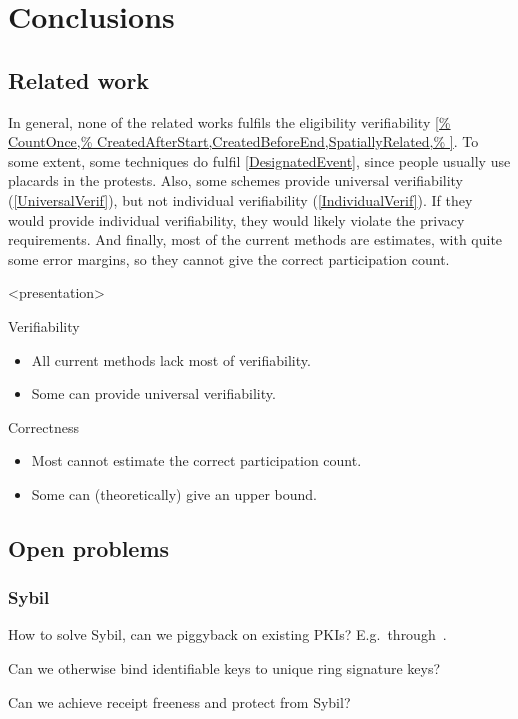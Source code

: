 \mode*
\section{Conclusions}

\subsection<presentation>{Related work}

In general, none of the related works fulfils the eligibility verifiability 
\cref{%
  CountOnce,%
  CreatedAfterStart,CreatedBeforeEnd,SpatiallyRelated,%
}.
To some extent, some techniques do fulfil \cref{DesignatedEvent}, since people 
usually use placards in the protests.
Also, some schemes provide universal verifiability (\cref{UniversalVerif}), but 
not individual verifiability (\cref{IndividualVerif}).
If they would provide individual verifiability, they would likely violate the 
privacy requirements.
And finally, most of the current methods are estimates, with quite some error 
margins, so they cannot give the correct participation count.

\begin{frame}<presentation>
  \begin{block}{Verifiability}
    \begin{itemize}
      \item All current methods lack most of verifiability.
      \item Some can provide universal verifiability.
    \end{itemize}
  \end{block}

  \pause{}

  \begin{block}{Correctness}
    \begin{itemize}
      \item Most cannot estimate the correct participation count.
      \item Some can (theoretically) give an upper bound.
    \end{itemize}
  \end{block}
\end{frame}

\subsection{Open problems}

\begin{frame}
  \frametitle{Sybil}
  \begin{question}
    How to solve Sybil, can we piggyback on existing \acp{PKI}?
    E.g.\ through~\cite{Cinderella}.
  \end{question}

  \begin{question}
    Can we otherwise bind identifiable keys to unique ring signature keys?
  \end{question}

  \begin{question}
    Can we achieve receipt freeness and protect from Sybil?
  \end{question}
\end{frame}

